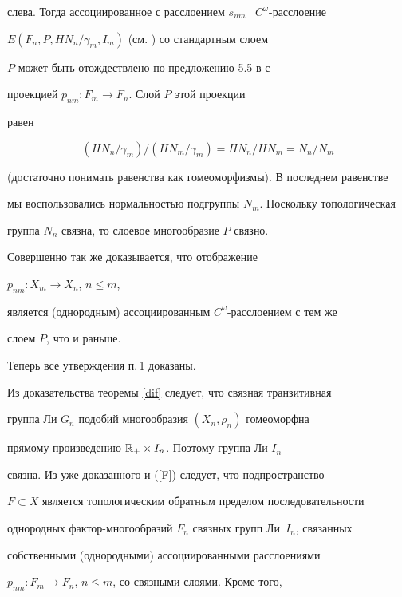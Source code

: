 \begin{pf}
слева. Тогда ассоциированное с расслоением $s_{nm}$ \ $C^{\omega}$-расслоение


$E(F_{n},P,HN_{n}/\gamma_{m},I_{m})$ (см. \cite{KN}) со стандартным слоем


$P$ может быть отождествлено по предложению 5.5 в \cite{KN} с


проекцией $p_{nm}:F_{m} \rightarrow F_{n}$. Слой $P$ этой проекции


равен


$$


(HN_{n}/\gamma_{m})/(HN_{m}/\gamma_{m})=HN_{n}/HN_{m}=N_{n}/N_{m}


$$


(достаточно понимать равенства как гомеоморфизмы). В последнем равенстве


мы воспользовались нормальностью подгруппы $N_{m}$. Поскольку топологическая


группа $N_{n}$ связна, то слоевое многообразие $P$ связно.





Совершенно так же доказывается, что отображение


$p_{nm}:X_{m} \rightarrow X_{n}$, $n \leq m$,


является (однородным) ассоциированным $C^{\omega}$-расслоением с тем же


слоем $P$, что и раньше.





Теперь все утверждения п.\,1 доказаны.





Из доказательства теоремы \ref{dif} следует, что связная транзитивная


группа Ли $G_{n}$ подобий многообразия $(X_{n},\rho_{n})$ гомеоморфна


прямому произведению $\Bbb{R}_{+}\times I_{n}$. Поэтому группа Ли $I_{n}$


связна. Из уже доказанного и (\ref{F}) следует, что подпространство


$F \subset X$ является топологическим обратным пределом последовательности


однородных фактор-многообразий $F_{n}$ связных групп Ли~$I_{n}$, связанных


собственными (однородными) ассоциированными расслоениями


$p_{nm}:F_{m}\rightarrow F_{n}$, $n\leq m$, со связными слоями. Кроме того,



\end{pf}
